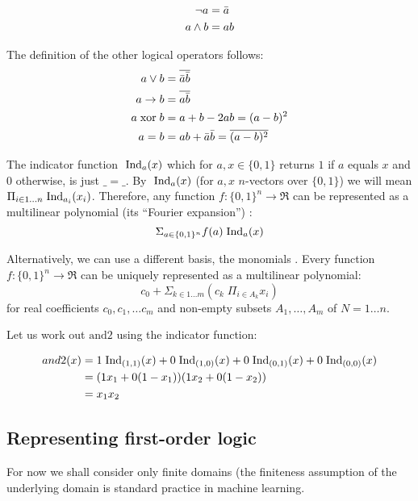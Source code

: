 \documentclass{article} %
\begin{document}
\begin{align*}
  \neg a &= \bar{a}\\
  a \wedge b &= a b
\end{align*}

The definition of the other logical operators follows:
  \begin{align*}
  a\vee b &= \overline{\bar{a}\bar{b}} \\
  a \rightarrow b &= \overline{a\bar{b}}\\
  a \;\mbox{xor}\; b &= a + b - 2ab=(a-b)^2\\
  a = b &=a b + \bar{a}\bar{b} =\overline{(a-b)^2}
  \end{align*}

The indicator function $\;\mbox{Ind}_a(x)$ which for $a,x \in \{0,1\}$ returns
$1$ if $a$ equals $x$ and $0$ otherwise, is just $\_=\_$. By
$\;\mbox{Ind}_a(x)$ (for $a,x$ $n$-vectors over $\{0, 1\}$) we will mean $\Pi_{i
  \in 1\ldots n} \;\mbox{Ind}_{a_i}(x_i)$.  Therefore, any function
$f:\{0,1\}^n \rightarrow \Re$ can be represented as a multilinear
polynomial (its ``Fourier expansion'') \cite{boolean-function}:
$$\Sigma_{a \in \{0,1\}^n} f(a)\;\mbox{Ind}_{a}(x)$$

Alternatively, we can use a different basis, the monomials \cite{PB-optimization}. Every
function $f:\{0,1\}^n \rightarrow \Re$ can be uniquely represented as a multilinear polynomial: 
$$ c_0 + \Sigma_{k \in 1\ldots m} (c_k\; \Pi_{i \in A_k} x_i)$$
\noindent for real coefficients $c_0, c_1, \ldots c_m$ and non-empty
subsets $A_1, \ldots, A_m$ of $N = 1 \ldots n$. 

Let us work out $\mbox{and2}$ using the indicator function:

\begin{align*}
and2(x)  &= 1 \;\mbox{Ind}_{(1,1)}(x) + 0\;\mbox{Ind}_{(1,0)}(x) + 0\;\mbox{Ind}_{(0,1)}(x) + 0\;\mbox{Ind}_{(0,0)}(x)\\
  &= (1  x_1+0(1-x_1))(1  x_2+0(1-x_2))\\
  &=x_1 x_2
\end{align*}

\subsection{Representing first-order logic}
For now we shall consider only finite domains (the finiteness assumption of the underlying domain is standard practice in machine learning.
\end{document}
